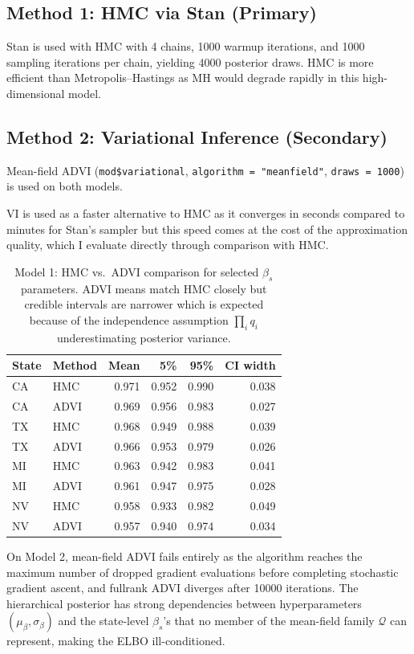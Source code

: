 \documentclass[10pt]{article}
\begin{document}
\subsection{Method 1: HMC via Stan (Primary)}
Stan is used with HMC with 4 chains, 1000 warmup iterations, and 1000
sampling iterations per chain, yielding 4000 posterior draws.
HMC is more efficient than
Metropolis--Hastings as MH would degrade rapidly in this high-dimensional model.

\subsection{Method 2: Variational Inference (Secondary)}
Mean-field ADVI (\texttt{mod\$variational},
\texttt{algorithm = "meanfield"}, \texttt{draws = 1000}) is used on both models.

VI is used as a faster alternative to HMC as it converges
in seconds compared to minutes for Stan's sampler but this speed
comes at the cost of the approximation quality, which I evaluate directly
through comparison with HMC. \\ 

\begin{table}[h]\centering\small
\begin{tabular}{llrrrr}
\toprule
State & Method & Mean & 5\% & 95\% & CI width \\
\midrule
CA & HMC & 0.971 & 0.952 & 0.990 & 0.038 \\
CA & ADVI & 0.969 & 0.956 & 0.983 & 0.027 \\
TX & HMC & 0.968 & 0.949 & 0.988 & 0.039 \\
TX & ADVI & 0.966 & 0.953 & 0.979 & 0.026 \\
MI & HMC & 0.963 & 0.942 & 0.983 & 0.041 \\
MI & ADVI & 0.961 & 0.947 & 0.975 & 0.028 \\
NV & HMC & 0.958 & 0.933 & 0.982 & 0.049 \\
NV & ADVI & 0.957 & 0.940 & 0.974 & 0.034 \\
\bottomrule
\end{tabular}
\caption{Model 1: HMC vs.\ ADVI comparison for selected $\beta_s$ parameters.
ADVI means match HMC closely but credible intervals are narrower which is expected because of the
independence assumption $\prod_i q_i$ underestimating posterior variance.}
\end{table}

On Model 2, mean-field ADVI fails entirely as the algorithm reaches the
maximum number of dropped gradient evaluations before completing stochastic
gradient ascent, and fullrank ADVI diverges after 10000 iterations.
The hierarchical posterior has strong dependencies between hyperparameters
$(\mu_\beta, \sigma_\beta)$ and the state-level $\beta_s$'s that no member
of the mean-field family $\mathscr{Q}$ can represent, making the ELBO ill-conditioned. \\ 
\end{document}
